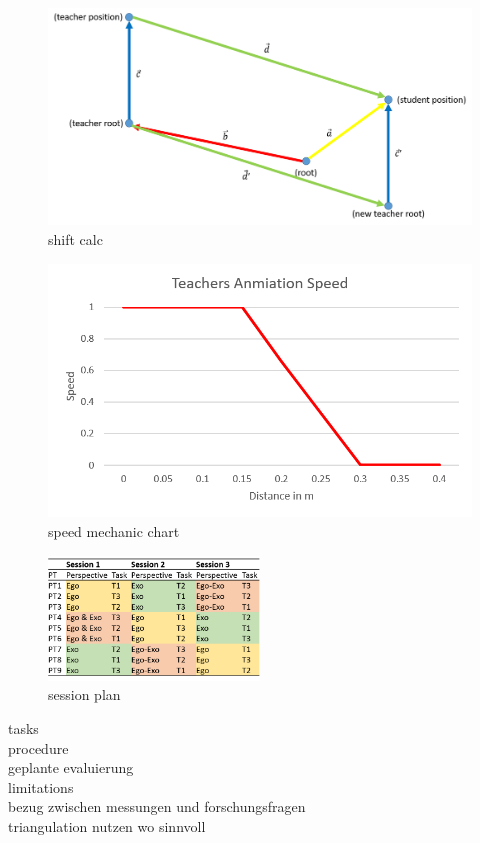 \begin{figure}[htb]
	\centering
	\includegraphics[width=\textwidth]{figures/shift_calc.png}
	\caption[shift calc]{shift calc}
	\label{fig:shift_calc}
\end{figure}

\begin{figure}[htb]
	\centering
	\includegraphics[width=\textwidth]{figures/speed_mechanic_chart.png}
	\caption[speed mechanic chart]{speed mechanic chart}
	\label{fig:speed_mechanic_chart}
\end{figure}

\begin{figure}[htb]
	\centering
	\includegraphics[width=0.5\textwidth]{figures/study_session_plan.png}
	\caption[session plan]{session plan}
	\label{fig:study_session_plan}
\end{figure}

tasks\\
procedure\\
geplante evaluierung\\
limitations\\
bezug zwischen messungen und forschungsfragen\\
triangulation nutzen wo sinnvoll\\
